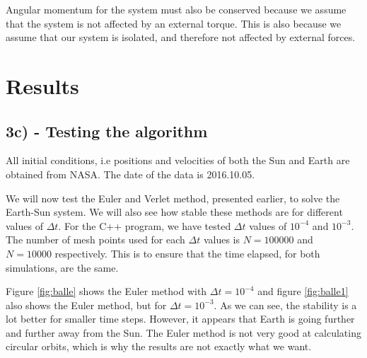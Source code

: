 \documentclass[12pt]{article}
\begin{document}
Angular momentum for the system must also be conserved because we assume that the system is not affected by an external torque. This is also because we assume that our system is isolated, and therefore not affected by external forces.
\section*{Results}

\subsection*{3c) - Testing the algorithm}
All initial conditions, i.e positions and velocities of both the Sun and Earth are obtained from NASA. The date of the data is 2016.10.05.


We will now test the Euler and Verlet method, presented earlier, to solve the Earth-Sun system. We will also see how stable these methods are for different values of $\Delta t$. For the C++ program, we have tested $\Delta t$ values of $10^{-4}$ and $10^{-3}$. The number of mesh points used for each $\Delta t$ values is $N = 100 000$ and $N=10 000$ respectively. This is to ensure that the time elapsed, for both simulations, are the same.

Figure \ref{fig:balle} shows the Euler method with $\Delta t = 10^{-4}$ and figure \ref{fig:balle1} also shows the Euler method, but for $\Delta t = 10^{-3}$. As we can see, the stability is a lot better for smaller time steps. However, it appears that Earth is going further and further away from the Sun. The Euler method is not very good at calculating circular orbits, which is why the results are not exactly what we want.
\end{document}
